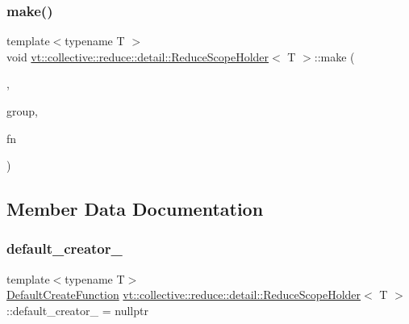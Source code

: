 \mbox{\label{structvt_1_1collective_1_1reduce_1_1detail_1_1_reduce_scope_holder_a47ef025fc658370a2d42680f7c006abb}} 
\subsubsection{\texorpdfstring{make()}{make()}\hspace{0.1cm}{\footnotesize\ttfamily [2/2]}}
{\footnotesize\ttfamily template$<$typename T $>$ \\
void \hyperlink{structvt_1_1collective_1_1reduce_1_1detail_1_1_reduce_scope_holder}{vt\+::collective\+::reduce\+::detail\+::\+Reduce\+Scope\+Holder}$<$ T $>$\+::make (\begin{DoxyParamCaption}\item[{\hyperlink{structvt_1_1collective_1_1reduce_1_1detail_1_1_reduce_scope_holder_1_1_group_tag}{Group\+Tag}}]{,  }\item[{\hyperlink{namespacevt_a27b5e4411c9b6140c49100e050e2f743}{Group\+Type}}]{group,  }\item[{\hyperlink{structvt_1_1collective_1_1reduce_1_1detail_1_1_reduce_scope_holder_ac1bca1874a023b11bdc3c26b165c3b20}{Default\+Create\+Function}}]{fn }\end{DoxyParamCaption})}



\subsection{Member Data Documentation}
\mbox{\label{structvt_1_1collective_1_1reduce_1_1detail_1_1_reduce_scope_holder_abd3a6a6a1eda5083b97348c16ef58858}} 
\subsubsection{\texorpdfstring{default\+\_\+creator\+\_\+}{default\_creator\_}}
{\footnotesize\ttfamily template$<$typename T$>$ \\
\hyperlink{structvt_1_1collective_1_1reduce_1_1detail_1_1_reduce_scope_holder_ac1bca1874a023b11bdc3c26b165c3b20}{Default\+Create\+Function} \hyperlink{structvt_1_1collective_1_1reduce_1_1detail_1_1_reduce_scope_holder}{vt\+::collective\+::reduce\+::detail\+::\+Reduce\+Scope\+Holder}$<$ T $>$\+::default\+\_\+creator\+\_\+ = nullptr\hspace{0.3cm}{\ttfamily [private]}}

